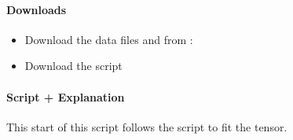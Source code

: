 \documentclass[a4paper,10pt,english,openany,oneside]{sphinxmanual}
\begin{document}
\paragraph{Downloads}
\label{\detokenize{examples/pcs_fit_uncertainty:downloads}}\begin{itemize}
\item {} 
\sphinxAtStartPar
Download the data files  and  from :

\item {} 
\sphinxAtStartPar
Download the script 

\end{itemize}


\paragraph{Script + Explanation}
\label{\detokenize{examples/pcs_fit_uncertainty:script-explanation}}
\sphinxAtStartPar
This start of this script follows the script {\hyperref[\detokenize{examples/pcs_fit:pcs-fit}]{}} to fit the tensor.
\end{document}
